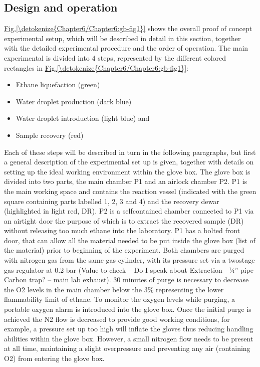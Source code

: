 \documentclass[letterpaper,10pt,english]{jupyterBook}
\begin{document}
\subsection{Design and operation}
\label{\detokenize{Chapter6/Chapter6:design-and-operation}}
\sphinxAtStartPar
\hyperref[\detokenize{Chapter6/Chapter6:gb-fig1}]{Fig.\@ \ref{\detokenize{Chapter6/Chapter6:gb-fig1}}} shows the overall proof of concept experimental setup, which will be described in detail in this section, together with the detailed experimental procedure and the order of operation. The main experimental is divided into 4 steps, represented by the different colored rectangles in \hyperref[\detokenize{Chapter6/Chapter6:gb-fig1}]{Fig.\@ \ref{\detokenize{Chapter6/Chapter6:gb-fig1}}}:
\begin{itemize}
\item {} 
\sphinxAtStartPar
Ethane liquefaction (green)

\item {} 
\sphinxAtStartPar
Water droplet production (dark blue)

\item {} 
\sphinxAtStartPar
Water droplet introduction (light blue) and

\item {} 
\sphinxAtStartPar
Sample recovery (red)

\end{itemize}

\sphinxAtStartPar
Each of these steps will be described in turn in the following paragraphs, but first a general description of the experimental set up is given, together with details on setting up the ideal working environment within the glove box.
The glove box is divided into two parts, the main chamber P1 and an airlock chamber P2. P1 is the main working space and contains the reaction vessel (indicated with the green square containing parts labelled 1, 2, 3 and 4) and the recovery dewar (highlighted in light red, DR). P2 is a self\sphinxhyphen{}contained chamber connected to P1 via an air\sphinxhyphen{}tight door the purpose of which is to extract the recovered sample (DR) without releasing too much ethane into the laboratory. P1 has a bolted front door, that can allow all the material needed to be put inside the glove box (list of the material) prior to beginning of the experiment.
Both chambers are purged with nitrogen gas from the same gas cylinder, with its pressure set via a two\sphinxhyphen{}stage gas regulator at 0.2 bar (Value to check – Do I speak about Extraction  ¼” pipe \sphinxhyphen{} Carbon trap? – main lab exhaust). 30 minutes of purge is necessary to decrease the O2 levels in the main chamber below the 3\% representing the lower flammability limit of ethane. To monitor the oxygen levels while purging, a portable oxygen alarm is introduced into the glove box.
Once the initial purge is achieved the N2 flow is decreased to provide good working conditions, for example, a pressure set up too high will inflate the gloves thus reducing handling abilities within the glove box. However, a small nitrogen flow needs to be present at all time, maintaining a slight overpressure and preventing any air (containing O2) from entering the glove box.
\end{document}
